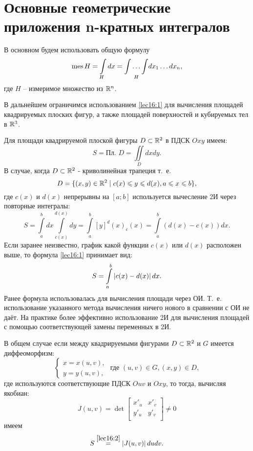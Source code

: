 \documentclass[../../main.tex]{subfiles}
\begin{document}
\section{Основные геометрические приложения n-кратных интегралов}

В основном будем использовать общую формулу
\begin{equation}
\label{lec16:1}
\operatorname{mes} H = \int\limits_Hdx = \underset{H}{\int \ldots \int}dx_1 \ldots dx_n,
\end{equation}
где $H$ -- измеримое множество из $\mathbb{R}^n$.

В дальнейшем ограничимся
использованием \eqref{lec16:1} для вычисления площадей квадрируемых плоских
фигур, а также площадей поверхностей и кубируемых тел в $\mathbb{R}^{3}$.

Для площади квадрируемой плоской фигуры $D \subset \mathbb{R}^{2}$ в ПДСК
$Oxy$ имеем:
\begin{equation}
\label{lec16:2}
S = \text{Пл. } D = \iint\limits_Ddxdy.
\end{equation}
В случае, когда $D \subset \mathbb{R}^{2}$ - криволинейная трапеция т.~е. 
\begin{equation}
\label{lec16:3}
	D=\{
	(x,y)\in \mathbb{R}^2 \mid c(x)\leqslant y\leqslant d(x), a\leqslant x \leqslant b
	\},
\end{equation}
где $c(x)$ и $d(x)$ непрерывны на $\left[a; b\right]$
 используется вычесление 2И через повторные интегралы:
\begin{equation}
\label{lec16:4}
S = \int\limits_a^bdx\int\limits_{c(x)}^{d(x)}dy = 
\int\limits_a^b\left[y\right]^d(x)_c(x)
=\int\limits_a^b(d(x) - c(x))dx.
\end{equation}
Если заранее неизвестно, график какой функции  $c(x)$ или $d(x)$ 
расположен выше, то формула \eqref{lec16:1} принимает вид:
\begin{equation}
\label{lec16:5}
S =  \int\limits_a^b\left|{c(x) - d(x)}\right|dx.
\end{equation}
Ранее формула использовалась для вычисления
 площади через ОИ. Т.~е. использование
  указанного метода вычисления {ничего нового}
в сравнении с ОИ не даёт. На практике
 более эффективно использование 2И для
  вычисления площадей с помощью соответствующей замены переменных в 2И.


В общем случае если между квадрируемыми фигурами 
$D\subset \mathbb{R}^2$ и $G$ имеется диффеоморфизм:
\begin{equation*}
\begin{cases}
x = x(u, v), \\
y = y(u, v),
\end{cases}
\text{ где }  (u, v) \in G, (x, y) \in D,
\end{equation*}
где используются соответствующие ПДСК $Ouv$ и $Oxy$, 
то тогда, вычисляя якобиан:
\begin{equation*}
J(u,v) = \det
\begin{bmatrix}
x'_u & x'_v\\
y'_u & y'_v\\
\end{bmatrix}
\neq 0
\end{equation*}
имеем
\begin{equation}
\label{lec16:6}
S \overset{\ref{lec16:2}}{=}  \left|{ J(u,v)}\right| dudv.
\end{equation}
\end{document}
